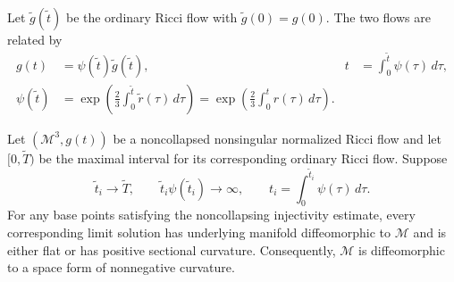 Let $\widetilde g(\widetilde t)$ be the ordinary Ricci flow with
$\widetilde g(0)=g(0)$.  The two flows are related by
\begin{align*}
 g(t)&=\psi(\widetilde t)\widetilde g(\widetilde t),
 &t&=\int_0^{\widetilde t}\psi(\tau)\,d\tau, \tag{32.9}\\
 \psi(\widetilde t)
 &=\exp\left(\frac23\int_0^{\widetilde t}\widetilde r(\tau)\,d\tau\right)
 =\exp\left(\frac23\int_0^t r(\tau)\,d\tau\right). \tag{32.10}
\end{align*}

\begin{lemma}
\label{lem:chow-iv-limit-nonnegative-curvature-criterion}


Let $(\mathcal M^3,g(t))$ be a noncollapsed nonsingular normalized Ricci
flow and let $[0,\widetilde T)$ be the maximal interval for its corresponding
ordinary Ricci flow.  Suppose
\[
 \widetilde t_i\to\widetilde T,
 \qquad
 \widetilde t_i\psi(\widetilde t_i)\to\infty,
 \qquad
 t_i=\int_0^{\widetilde t_i}\psi(\tau)\,d\tau.
 \tag{32.11}
\]
For any base points satisfying the noncollapsing injectivity estimate, every
corresponding limit solution has underlying manifold diffeomorphic to
$\mathcal M$ and is either flat or has positive sectional curvature.
Consequently, $\mathcal M$ is diffeomorphic to a space form of nonnegative
curvature.
\end{lemma}
